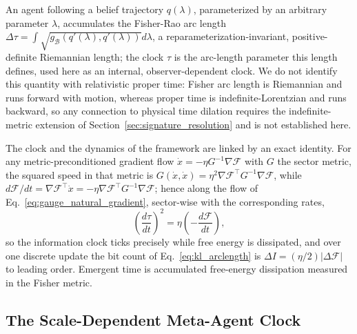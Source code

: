 \documentclass[11pt]{article}
\begin{document}
An agent following a belief trajectory $q(\lambda)$, parameterized by an arbitrary parameter $\lambda$, accumulates the Fisher-Rao arc length $\Delta\tau = \int \sqrt{g_{\mathcal{B}}(q'(\lambda), q'(\lambda))} d\lambda$, a reparameterization-invariant, positive-definite Riemannian length; the clock $\tau$ is the arc-length parameter this length defines, used here as an internal, observer-dependent clock. We do not identify this quantity with relativistic proper time: Fisher arc length is Riemannian and runs forward with motion, whereas proper time is indefinite-Lorentzian and runs backward, so any connection to physical time dilation requires the indefinite-metric extension of Section~\ref{sec:signature_resolution} and is not established here.

The clock and the dynamics of the framework are linked by an exact identity. For any metric-preconditioned gradient flow $\dot{x} = -\eta G^{-1}\nabla\mathcal{F}$ with $G$ the sector metric, the squared speed in that metric is $G(\dot{x}, \dot{x}) = \eta^2 \nabla\mathcal{F}^\top G^{-1}\nabla\mathcal{F}$, while $d\mathcal{F}/dt = \nabla\mathcal{F}^\top \dot{x} = -\eta \nabla\mathcal{F}^\top G^{-1}\nabla\mathcal{F}$; hence along the flow of Eq.~\eqref{eq:gauge_natural_gradient}, sector-wise with the corresponding rates,
\begin{equation}
\left(\frac{d\tau}{dt}\right)^2 = \eta\left(-\frac{d\mathcal{F}}{dt}\right),
\label{eq:clock_dissipation}
\end{equation}
so the information clock ticks precisely while free energy is dissipated, and over one discrete update the bit count of Eq.~\eqref{eq:kl_arclength} is $\Delta I = (\eta/2)|\Delta\mathcal{F}|$ to leading order. Emergent time is accumulated free-energy dissipation measured in the Fisher metric.

\subsection{The Scale-Dependent Meta-Agent Clock}
\label{sec:scale_dependent_time}
\end{document}
